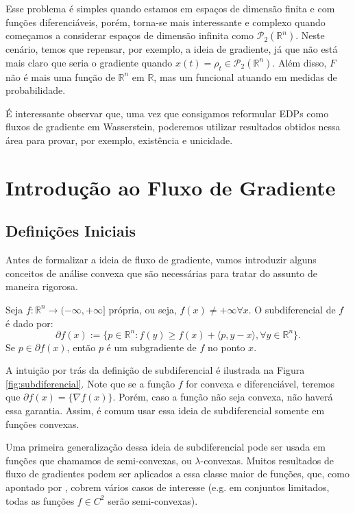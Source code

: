 Esse problema é simples quando estamos em espaços de dimensão finita e com
funções diferenciáveis, porém, torna-se mais
interessante e complexo quando começamos a considerar espaços de dimensão infinita
como $\mathcal P_2(\mathbb R^n)$. Neste cenário, temos que repensar, por exemplo,
a ideia de gradiente, já que não está mais claro que seria o gradiente quando
$x(t) = \rho_t \in \mathcal P_2(\mathbb R^n)$. Além disso, $F$ não é mais uma
função de $\mathbb R^n$ em $\mathbb R$, mas um funcional atuando em medidas
de probabilidade.

É interessante observar que, uma vez que consigamos reformular EDPs
como fluxos de gradiente em Wasserstein, poderemos utilizar resultados
obtidos nessa área para provar, por exemplo, existência e unicidade.

\section{Introdução ao Fluxo de Gradiente}

\subsection{Definições Iniciais}

Antes de formalizar a ideia de fluxo de gradiente, vamos introduzir alguns
conceitos de análise convexa que são necessárias para tratar
do assunto de maneira rigorosa.

\begin{definition}[Subdiferencial]
    Seja $f:\mathbb R^n \to (-\infty, +\infty]$ própria, ou seja, $f(x) \neq +\infty \forall x$.
    O subdiferencial de $f$ é dado por:
    \begin{equation}
        \partial f(x) := \{p \in \mathbb R^n:
        f(y) \geq f(x) + \langle p, y-x\rangle, \forall y \in \mathbb R^n
        \}.
    \end{equation}
    Se $p \in \partial f(x)$, então $p$ é um subgradiente de $f$ no ponto $x$.
\end{definition}
A intuição por trás da definição
de subdiferencial é ilustrada na Figura \ref{fig:subdiferencial}.
Note que se a função $f$ for convexa e diferenciável, teremos que $\partial f(x) = \{\nabla f(x)\}$.
Porém, caso a função não seja convexa, não haverá essa garantia. Assim, é comum usar essa ideia de
subdiferencial somente em funções convexas.

Uma primeira generalização dessa ideia de subdiferencial pode ser usada em funções que chamamos
de semi-convexas, ou $\lambda$-convexas. Muitos resultados de fluxo de gradientes podem ser
aplicados a essa classe maior de funções, que, como apontado por \citet{santambrogio2017euclidean},
cobrem vários casos de interesse (e.g. em conjuntos limitados,
todas as funções $f \in C^2$ serão semi-convexas).

